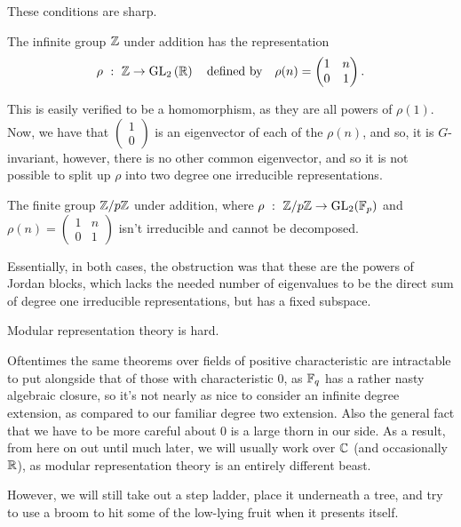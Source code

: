 \documentclass{article}
\begin{document}
These conditions are sharp.
\begin{example}
The infinite group $\mathbb Z$ under addition has the representation $$\rho \ : \ \ZZ \to \GL_2\left(\RR\right) \quad \textrm{defined by} \quad \rho(n) = \begin{pmatrix} 1 & n \\ 0 & 1 \end{pmatrix}.$$
\end{example}

This is easily verified to be a homomorphism, as they are all powers of $\rho(1)$. Now, we have that $\begin{pmatrix} 1  \\ 0 \end{pmatrix}$ is an eigenvector of each of the $\rho(n)$, and so, it is $G$-invariant, however, there is no other common eigenvector, and so it is not possible to split up $\rho$ into two degree one irreducible representations.

\begin{example}
The finite group $\mathbb Z/p\mathbb Z$ under addition, where $\rho  \ : \ \mathbb Z/p\mathbb Z \to \operatorname{GL}_2(\mathbb F_p)$ and $\rho(n) = \begin{pmatrix} 1 & n \\ 0 & 1 \end{pmatrix}$ isn't irreducible and cannot be decomposed.
\end{example}

Essentially, in both cases, the obstruction was that these are the powers of Jordan blocks, which lacks the needed number of eigenvalues to be the direct sum of degree one irreducible representations, but has a fixed subspace.

\begin{note}
Modular representation theory is hard.
\end{note}
Oftentimes the same theorems over fields of positive characteristic are intractable to put alongside that of those with characteristic $0$, as $\mathbb F_q$ has a rather nasty algebraic closure, so it's not nearly as nice to consider an infinite degree extension, as compared to our familiar degree two extension. Also the general fact that we have to be more careful about $0$ is a large thorn in our side. As a result, from here on out until much later, we will usually work over $\mathbb C$ (and occasionally $\mathbb R$), as modular representation theory is an entirely different beast. 

However, we will still take out a step ladder, place it underneath a tree, and try to use a broom to hit some of the low-lying fruit when it presents itself.
\end{document}
